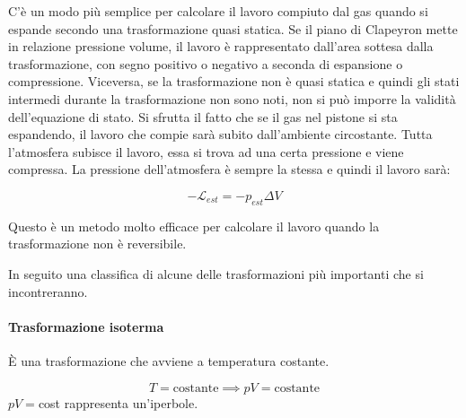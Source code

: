 C'è un modo più semplice per calcolare il lavoro compiuto dal gas quando si espande secondo una trasformazione quasi statica. Se il piano di Clapeyron mette in relazione pressione volume, il lavoro è rappresentato dall'area sottesa dalla trasformazione, con segno positivo o negativo a seconda di espansione o compressione.
Viceversa, se la trasformazione non è quasi statica e quindi gli stati intermedi durante la trasformazione non sono noti, non si può imporre la validità dell'equazione di stato. Si sfrutta il fatto che se il gas nel pistone si sta espandendo, il lavoro che compie sarà subito dall'ambiente circostante. Tutta l'atmosfera subisce il lavoro, essa si trova ad una certa pressione e viene compressa. La pressione dell'atmosfera è sempre la stessa e quindi il lavoro sarà:

\[
	-\mathcal{L}_{est} = - p_{est}\Delta V
\]

Questo è un metodo molto efficace per calcolare il lavoro quando la trasformazione non è reversibile.

In seguito una classifica di alcune delle trasformazioni più importanti che si incontreranno.

\paragraph{Trasformazione isoterma} È una trasformazione che avviene a temperatura costante.

\[
	T=\text{costante} \implies pV=\text{costante}
\]
$pV=$cost rappresenta un'iperbole.

